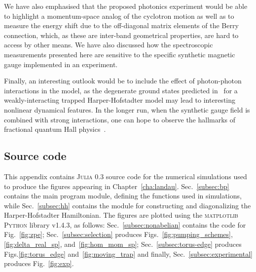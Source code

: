We have also emphasised that the proposed photonics experiment would
be able to highlight a momentum-space analog of the cyclotron motion
as well as to measure the energy shift due to the off-diagonal matrix
elements of the Berry connection, which, as these are inter-band
geometrical properties, are hard to access by other means. We have
also discussed how the spectroscopic measurements presented here are
sensitive to the specific synthetic magnetic gauge implemented in an
experiment.

Finally, an interesting outlook would be to include the effect of
photon-photon interactions in the model, as the degenerate ground
states predicted in~\cite{ozawa2014momhh} for a weakly-interacting
trapped Harper-Hofstadter model may lead to interesting nonlinear
dynamical features. In the longer run, when the synthetic gauge field
is combined with strong interactions, one can hope to observe the
hallmarks of fractional quantum Hall
physics~\cite{umucalilar2012fractional,hafezi2013non}.

\begin{subappendices}

  \section{Source code}\label{sec:source-code-landau}
  This appendix contains \textsc{Julia} 0.3 source code for the
numerical simulations used to produce the figures appearing in
Chapter~\ref{cha:landau}. Sec.~\ref{subsec:bp} contains the main
program module, defining the functions used in simulations, while
Sec.~\ref{subsec:hh} contains the module for constructing and
diagonalizing the Harper-Hofstadter Hamiltonian.
The figures are plotted using the \textsc{matplotlib} \textsc{Python}
library v1.4.3, as follows: Sec.~\ref{subsec:nonabelian} contains the
code for Fig.~\ref{fig:zpe}; Sec.~\ref{subsec:selection} produces
Figs.~\ref{fig:pumping_schemes}, \ref{fig:delta_real_sp},
and~\ref{fig:hom_mom_sp}; Sec.~\ref{subsec:torus-edge} produces
Figs.\ref{fig:torus_edge} and~\ref{fig:moving_trap} and finally,
Sec.~\ref{subsec:experimental} produces Fig.~\ref{fig:exp}.
  
\end{subappendices}


